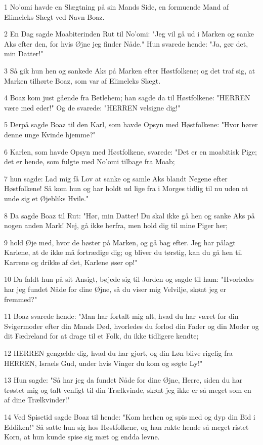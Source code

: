 \par 1 No'omi havde en Slægtning på sin Mands Side, en formuende Mand af Elimeleks Slægt ved Navn Boaz.
\par 2 En Dag sagde Moabiterinden Rut til No'omi: "Jeg vil gå ud i Marken og sanke Aks efter den, for hvis Øjne jeg finder Nåde." Hun svarede hende: "Ja, gør det, min Datter!"
\par 3 Så gik hun hen og sankede Aks på Marken efter Høstfolkene; og det traf sig, at Marken tilhørte Boaz, som var af Elimeleks Slægt.
\par 4 Boaz kom just gående fra Betlehem; han sagde da til Høstfolkene: "HERREN være med eder!" Og de svarede: "HERREN velsigne dig!"
\par 5 Derpå sagde Boaz til den Karl, som havde Opsyn med Høstfolkene: "Hvor hører denne unge Kvinde hjemme?"
\par 6 Karlen, som havde Opsyn med Høstfolkene, svarede: "Det er en moabitisk Pige; det er hende, som fulgte med No'omi tilbage fra Moab;
\par 7 hun sagde: Lad mig få Lov at sanke og samle Aks blandt Negene efter Høstfolkene! Så kom hun og har holdt ud lige fra i Morges tidlig til nu uden at unde sig et Øjebliks Hvile."
\par 8 Da sagde Boaz til Rut: "Hør, min Datter! Du skal ikke gå hen og sanke Aks på nogen anden Mark! Nej, gå ikke herfra, men hold dig til mine Piger her;
\par 9 hold Øje med, hvor de høster på Marken, og gå bag efter. Jeg har pålagt Karlene, at de ikke må fortrædige dig; og bliver du tørstig, kan du gå hen til Karrene og drikke af det, Karlene øser op!"
\par 10 Da faldt hun på sit Ansigt, bøjede sig til Jorden og sagde til ham: "Hvorledes har jeg fundet Nåde for dine Øjne, så du viser mig Velvilje, skønt jeg er fremmed?"
\par 11 Boaz svarede hende: "Man har fortalt mig alt, hvad du har været for din Svigermoder efter din Mands Død, hvorledes du forlod din Fader og din Moder og dit Fædreland for at drage til et Folk, du ikke tidligere kendte;
\par 12 HERREN gengælde dig, hvad du har gjort, og din Løn blive rigelig fra HERREN, Israels Gud, under hvis Vinger du kom og søgte Ly!"
\par 13 Hun sagde: "Så har jeg da fundet Nåde for dine Øjne, Herre, siden du har trøstet mig og talt venligt til din Trælkvinde, skønt jeg ikke er så meget som en af dine Trælkvinder!"
\par 14 Ved Spisetid sagde Boaz til hende: "Kom herhen og spis med og dyp din Bid i Eddiken!" Så satte hun sig hos Høstfolkene, og han rakte hende så meget ristet Korn, at hun kunde spise sig mæt og endda levne.
